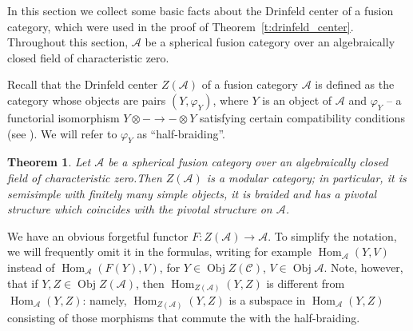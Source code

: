 \documentclass{amsart}
\newtheorem{theorem}{Theorem}[section]
\theoremstyle{definition}
\theoremstyle{remark}
\numberwithin{equation}{section}
\newcommand{\thref}[1]{Theorem~{\rm\ref{#1}}}
\newcommand{\<}{\langle}
\renewcommand{\>}{\rangle}
\newcommand{\C}{\mathcal{C}}      %
\newcommand{\A}{\mathcal{A}}      %
\newcommand{\ph}{\varphi}
\DeclareMathOperator{\Hom}{Hom}
\DeclareMathOperator{\Obj}{Obj}
\begin{document}
In this section we collect some basic facts about the Drinfeld center of a fusion category, which were used in the proof of \thref{t:drinfeld_center}. Throughout this section, $\A$ be a spherical fusion category over an algebraically closed  field of characteristic zero.


Recall that the Drinfeld center $Z(\A)$ of a fusion category $\A$
is defined as the category whose objects are pairs $(Y,\ph_Y)$, where $Y$
is an object of $\A$ and $\ph_Y$ -- a functorial isomorphism $Y\otimes -\to
-\otimes Y$ satisfying certain compatibility conditions (see
). We will refer to  $\ph_Y$ as ``half-braiding''.
    

\begin{theorem}{}
  Let $\A$ be a spherical fusion category over an algebraically closed   
  field of characteristic zero.Then  $Z(\A)$ is a modular category; in 
  particular, it is semisimple with finitely many simple objects, it is 
  braided and has a pivotal structure which coincides with the pivotal 
  structure on $\A$. 
\end{theorem}


We have an obvious forgetful functor $F\colon Z(\A)\to \A$. To simplify
the notation, we will frequently omit it in the formulas, writing for
example $\Hom_\A(Y,V)$ instead of $\Hom_\A(F(Y),V)$, for $Y\in \Obj
Z(\C)$, $V\in \Obj \A$. Note, however, that if $Y,Z\in \Obj Z(\A)$, then
$\Hom_{Z(\A)}(Y,Z)$ is different from $\Hom_{\A}(Y,Z)$: namely,
$\Hom_{Z(\A)}(Y,Z)$ is a subspace in $\Hom_{\A}(Y,Z)$ consisting of those
morphisms that commute the with the half-braiding. 
\end{document}
